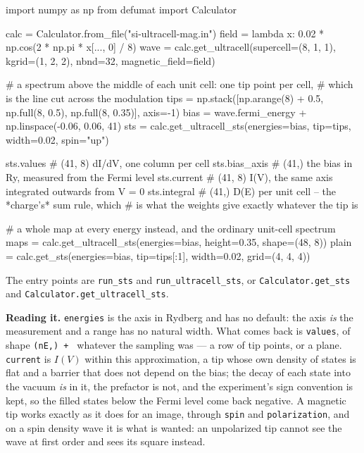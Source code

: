 \documentclass[11pt,a4paper]{article}
\newcommand{\code}[1]{\texttt{\small #1}}
\begin{document}
\begin{pycode}
import numpy as np
from defumat import Calculator

calc = Calculator.from_file("si-ultracell-mag.in")
field = lambda x: 0.02 * np.cos(2 * np.pi * x[..., 0] / 8)
wave = calc.get_ultracell(supercell=(8, 1, 1), kgrid=(1, 2, 2), nbnd=32,
                          magnetic_field=field)

# a spectrum above the middle of each unit cell: one tip point per cell,
# which is the line cut across the modulation
tips = np.stack([np.arange(8) + 0.5, np.full(8, 0.5), np.full(8, 0.35)], axis=-1)
bias = wave.fermi_energy + np.linspace(-0.06, 0.06, 41)
sts = calc.get_ultracell_sts(energies=bias, tip=tips, width=0.02, spin="up")

sts.values        # (41, 8) dI/dV, one column per cell
sts.bias_axis     # (41,) the bias in Ry, measured from the Fermi level
sts.current       # (41, 8) I(V), the same axis integrated outwards from V = 0
sts.integral      # (41,) D(E) per unit cell -- the *charge's* sum rule, which
                  # is what the weights give exactly whatever the tip is

# a whole map at every energy instead, and the ordinary unit-cell spectrum
maps = calc.get_ultracell_sts(energies=bias, height=0.35, shape=(48, 8))
plain = calc.get_sts(energies=bias, tip=tips[:1], width=0.02, grid=(4, 4, 4))
\end{pycode}

The entry points are \code{run\_sts} and \code{run\_ultracell\_sts}, or
\code{Calculator.get\_sts} and \code{Calculator.get\_ultracell\_sts}.

\textbf{Reading it.} \code{energies} is the axis in Rydberg and has no default:
the axis \emph{is} the measurement and a range has no natural width. What comes
back is \code{values}, of shape \code{(nE,) + } whatever the sampling was --- a
row of tip points, or a plane. \code{current} is $I(V)$ within this
approximation, a tip whose own density of states is flat and a barrier that does
not depend on the bias; the decay of each state into the vacuum \emph{is} in it,
the prefactor is not, and the experiment's sign convention is kept, so the filled
states below the Fermi level come back negative. A magnetic tip works exactly as
it does for an image, through \code{spin} and \code{polarization}, and on a spin
density wave it is what is wanted: an unpolarized tip cannot see the wave at
first order and sees its square instead.
\end{document}
